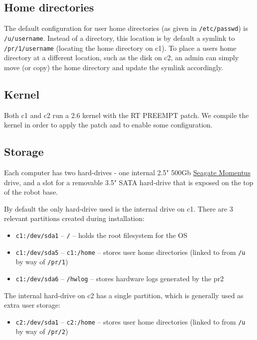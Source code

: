 \subsection{Home directories}
The default configuration for user home directories (as given in
\texttt{/etc/passwd}) is \texttt{/u/username}.  Instead of a
directory, this location is by default a symlink to
\texttt{/pr/1/username} (locating the home directory on c1).  To place
a users home directory at a different location, such as the disk on
c2, an admin can simply move (or copy) the home directory and update
the symlink accordingly.

\subsection{Kernel}
Both c1 and c2 run a 2.6 kernel with the RT PREEMPT patch.  We compile
the kernel in order to apply the patch and to enable some
configuration.

\subsection{Storage}
Each computer has two hard-drives - one internal 2.5" 500Gb
\href{http://www.seagate.com/www/en-us/products/laptops/momentus/momentus_7200.4_g_force/}{Seagate
  Momentus} drive, and a slot for a removable 3.5" SATA hard-drive
that is exposed on the top of the robot base.

By default the only hard-drive used is the internal drive on c1.
There are 3 relevant partitions created during installation:
\begin{itemize}
\item \texttt{c1:/dev/sda1} -- \texttt{/} -- holds the root filesystem
  for the OS
\item \texttt{c1:/dev/sda5} -- \texttt{c1:/home} -- stores user home
  directories (linked to from \texttt{/u} by way of \texttt{/pr/1})
\item \texttt{c1:/dev/sda6} -- \texttt{/hwlog} -- stores hardware logs
  generated by the pr2
\end{itemize}

The internal hard-drive on c2 has a single partition, which is
generally used as extra user storage:
\begin{itemize}
\item \texttt{c2:/dev/sda1} -- \texttt{c2:/home} -- stores user home
  directories (linked to from \texttt{/u} by way of \texttt{/pr/2})
\end{itemize}

